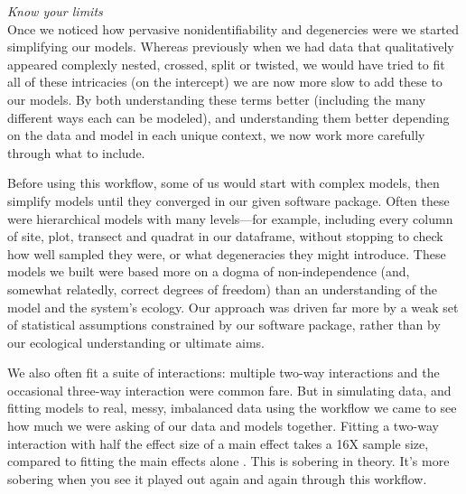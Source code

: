 \documentclass[11pt]{article}
\begin{document}
{ \emph{Know your limits} \\ %
Once we noticed how pervasive nonidentifiability and degenercies were we started simplifying our models. Whereas previously when we had data that qualitatively appeared complexly nested, crossed, split or twisted, we would have tried to fit all of these intricacies (on the intercept) we are now more slow to add these to our models. By both understanding these terms better (including the many different ways each can be modeled), and understanding them better depending on the data and model in each unique context, we now work more carefully through what to include. %

Before using this workflow, some of us would start with complex models, then simplify models until they converged in our given software package. Often these were hierarchical models with many levels---for example, including every column of site, plot, transect and quadrat in our dataframe, without stopping to check how well sampled they were, or what degeneracies they might introduce. These models we built were based more on a dogma of non-independence (and, somewhat relatedly, correct degrees of freedom) than an understanding of the model and the system's ecology. Our approach was driven far more by a weak set of statistical assumptions constrained by our software package, rather than by our ecological understanding or ultimate aims. 

We also often fit a suite of interactions: multiple two-way interactions and the occasional three-way interaction were common fare. But in simulating data, and fitting models to real, messy, imbalanced data using the workflow we came to see how much we were asking of our data and models together. Fitting a two-way interaction with half the effect size of a main effect takes a 16X sample size, compared to fitting the main effects alone \citep[the main effects then average over the interactions, see][for more details]{regotherstories}. This is sobering in theory. It's more sobering when you see it played out again and again through this workflow. 

}
\end{document}
